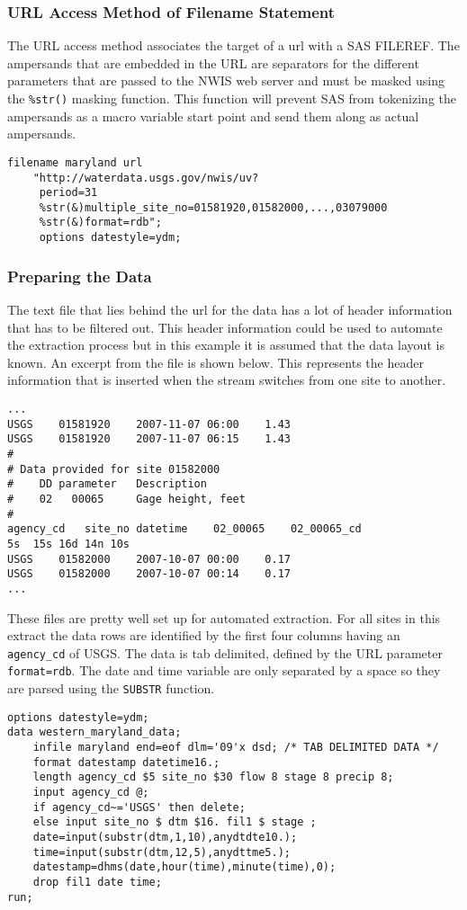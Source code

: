 \documentclass[10pt]{sugconf-ish}
\begin{document}
\subsubsection{URL Access Method of Filename Statement}
The URL access method associates the target of a url with a SAS FILEREF.  The ampersands that are embedded in the URL are separators for the different parameters that are passed to the NWIS web server and must be masked using the \texttt{\%str()} masking function.  This function will prevent SAS from tokenizing the ampersands as a macro variable start point and send them along as actual ampersands.
\begin{verbatim}
filename maryland url 
    "http://waterdata.usgs.gov/nwis/uv?
     period=31
     %str(&)multiple_site_no=01581920,01582000,...,03079000
     %str(&)format=rdb";
     options datestyle=ydm;
\end{verbatim}

\subsubsection{Preparing the Data}
The text file that lies behind the url for the data has a lot of header information that has to be filtered out.  This header information could be used to automate the extraction process but in this example it is assumed that the data layout is known.  An excerpt from the file is shown below. This represents the header information that is inserted when the stream switches from one site to another.  
\begin{verbatim}
...
USGS	01581920	2007-11-07 06:00	1.43	
USGS	01581920	2007-11-07 06:15	1.43	
#
# Data provided for site 01582000
#    DD parameter   Description
#    02   00065     Gage height, feet
#
agency_cd	site_no	datetime	02_00065	02_00065_cd
5s	15s	16d	14n	10s
USGS	01582000	2007-10-07 00:00	0.17	
USGS	01582000	2007-10-07 00:14	0.17	
...
\end{verbatim}
These files are pretty well set up for automated extraction.  For all sites in this extract the data rows are identified by the first four columns having an \texttt{agency\_cd} of USGS.  The data is tab delimited, defined by the URL parameter \texttt{format=rdb}.  The date and time variable are only separated by a space so they are parsed using the \texttt{SUBSTR} function.  

\begin{verbatim}     
options datestyle=ydm;
data western_maryland_data;
    infile maryland end=eof dlm='09'x dsd; /* TAB DELIMITED DATA */
    format datestamp datetime16.;
    length agency_cd $5 site_no $30 flow 8 stage 8 precip 8;
    input agency_cd @;
    if agency_cd~='USGS' then delete; 
    else input site_no $ dtm $16. fil1 $ stage ;
    date=input(substr(dtm,1,10),anydtdte10.); 
    time=input(substr(dtm,12,5),anydttme5.);
    datestamp=dhms(date,hour(time),minute(time),0);	
    drop fil1 date time;
run;
\end{verbatim}
\end{document}
